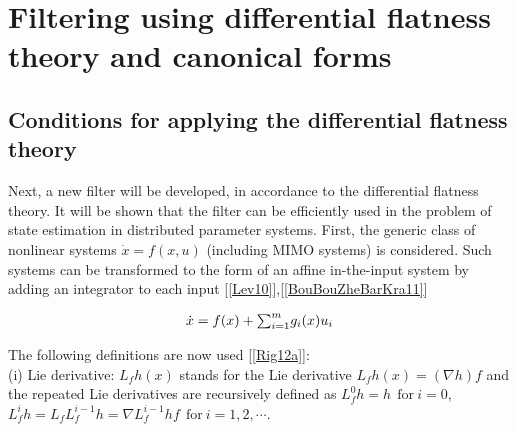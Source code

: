 \documentclass[journal]{IEEEtran}
\begin{document}
\section{Filtering using differential flatness theory and canonical forms} \label{section 2: Filtering_using_differential_flatness_theory_and_canonical_forms}





\subsection{Conditions for applying the differential flatness theory} \label{subsection 3.3: diffeomorphism_canonical_form}

\noindent Next, a new filter will be developed, in accordance to the differential flatness theory. It will be shown that the filter can be efficiently used in the problem of state estimation in distributed parameter systems. First, the  generic class of nonlinear systems $\dot{x}=f(x,u)$ (including MIMO systems) is considered. Such systems can be transformed to the form of an affine in-the-input system by adding an integrator to each input [\ref{Lev10}],[\ref{BouBouZheBarKra11}]

\begin{equation} \label{affine_in_the_input_system}
\begin{tabular}{c}
$\dot{x}=f(x)+{\sum_{i=1}^m}g_i(x){u_i}$
\end{tabular}
\end{equation}

\noindent The following definitions are now used [\ref{Rig12a}]:\\

\noindent (i) Lie derivative:  ${L_f}h(x)$ stands for the Lie derivative ${L_f}h(x)=({\nabla}h)f$ and the repeated Lie derivatives are recursively defined as ${L_f^0}h=h \ \ \text{for} \ i=0$, ${L_f^i}h={L_f}{{L_f^{i-1}}h}=\nabla{L_f^{i-1}h}f \ \ \text{for} \ i=1,2,\cdots$. \\
\end{document}
